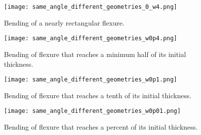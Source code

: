 \documentclass[12pt,reqno]{article}
\begin{document}
	\begin{figure}[H]
		\texttt{[image: same\_angle\_different\_geometries\_0\_w4.png]}
		\caption{Bending of a nearly rectangular flexure.}
	\end{figure}
	\begin{figure}[H]
		\texttt{[image: same\_angle\_different\_geometries\_w0p4.png]}
		\caption{Bending of flexure that reaches a minimum half of its initial thickness.}
	\end{figure}
	\begin{figure}[H]
		\texttt{[image: same\_angle\_different\_geometries\_w0p1.png]}
		\caption{Bending of flexure that reaches a tenth of its initial thickness.}
	\end{figure}
		\begin{figure}[H]
		\texttt{[image: same\_angle\_different\_geometries\_w0p01.png]}
		\caption{Bending of flexure that reaches a percent of its initial thickness.}
	\end{figure}
	
\end{document}
